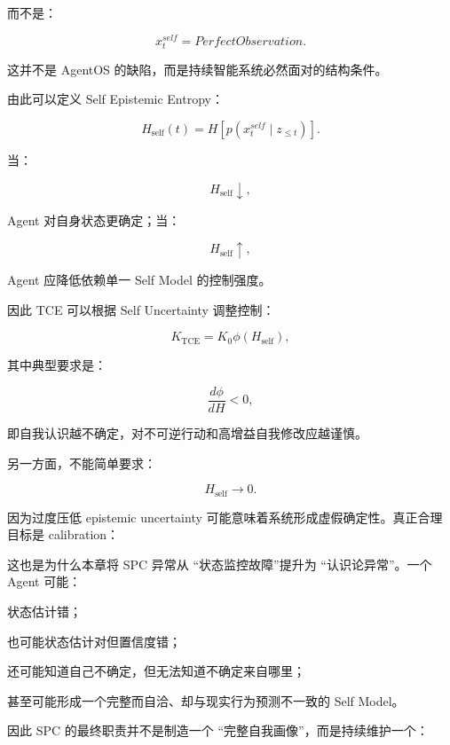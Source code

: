而不是：

\[
x_t^{self}
=
PerfectObservation.
\]

这并不是 AgentOS 的缺陷，而是持续智能系统必然面对的结构条件。

由此可以定义 Self Epistemic Entropy：

\[
H_{\mathrm{self}}(t)
=
H
\left[
p(
x_t^{self}\mid z_{\leq t}
)
\right].
\]

当：

\[
H_{\mathrm{self}}\downarrow,
\]

Agent 对自身状态更确定；当：

\[
H_{\mathrm{self}}\uparrow,
\]

Agent 应降低依赖单一 Self Model 的控制强度。

因此 TCE 可以根据 Self Uncertainty 调整控制：

\[
K_{\mathrm{TCE}}
=
K_0
\phi
\left(
H_{\mathrm{self}}
\right),
\]

其中典型要求是：

\[
\frac{d\phi}{dH}<0,
\]

即自我认识越不确定，对不可逆行动和高增益自我修改应越谨慎。

另一方面，不能简单要求：

\[
H_{\mathrm{self}}\rightarrow0.
\]

因为过度压低 epistemic uncertainty 可能意味着系统形成虚假确定性。真正合理目标是 calibration：

\begin{statementbox}
\centering
{}
\end{statementbox}

这也是为什么本章将 SPC 异常从 ``状态监控故障''提升为 ``认识论异常''。一个 Agent 可能：

状态估计错；

也可能状态估计对但置信度错；

还可能知道自己不确定，但无法知道不确定来自哪里；

甚至可能形成一个完整而自洽、却与现实行为预测不一致的 Self Model。

因此 SPC 的最终职责并不是制造一个 ``完整自我画像''，而是持续维护一个：

\begin{statementbox}
\centering
{}
\end{statementbox}

